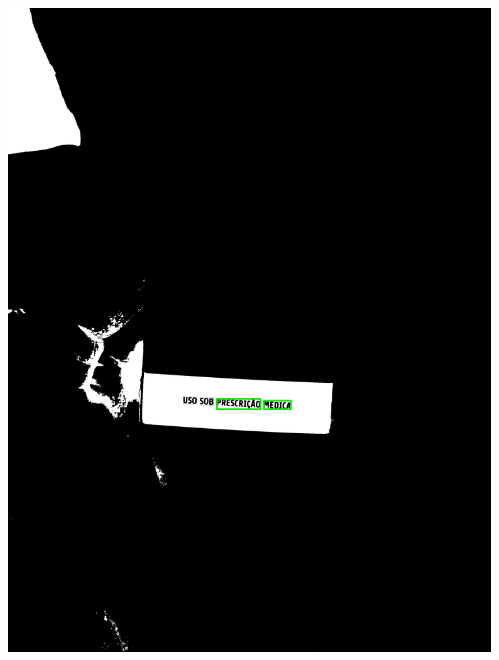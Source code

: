 \begin{frame}
\begin{columns}
\begin{column}{0.24\textwidth}
			\includegraphics[height=0.35\textheight]{../pictures/tysabri_cmyk_m_only_thresh_boxes.jpg}
		\end{column}
		\begin{column}{0.24\textwidth}\centering

\end{column}
\end{columns}
\end{frame}
